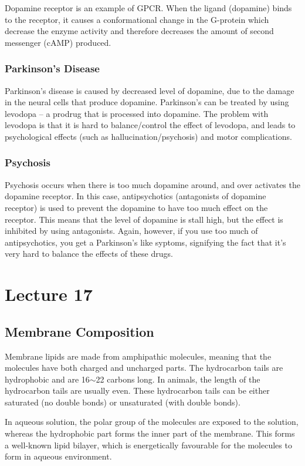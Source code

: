\documentclass[a4paper, 12pt]{report}
\newcommand{\mychapter}[2]{
    \setcounter{chapter}{#1}
    \setcounter{section}{0}
    \chapter*{#2}
    \addcontentsline{toc}{chapter}{#2}
}
\begin{document}
Dopamine receptor is an example of GPCR.
When the ligand (dopamine) binds to the receptor, it causes a conformational change in the G-protein which decrease the enzyme activity and therefore decreases the amount of second messenger (cAMP) produced.

\subsection{Parkinson's Disease}

Parkinson's disease is caused by decreased level of dopamine, due to the damage in the neural cells that produce dopamine.
Parkinson's can be treated by using levodopa -- a prodrug that is processed into dopamine.
The problem with levodopa is that it is hard to balance/control the effect of levodopa, and leads to psychological effects (such as hallucination/psychosis) and motor complications.

\subsection{Psychosis}

Psychosis occurs when there is too much dopamine around, and over activates the dopamine receptor.
In this case, antipsychotics (antagonists of dopamine receptor) is used to prevent the dopamine to have too much effect on the receptor.
This means that the level of dopamine is stall high, but the effect is inhibited by using antagonists.
Again, however, if you use too much of antipsychotics, you get a Parkinson's like syptoms, signifying the fact that it's very hard to balance the effects of these drugs.

\mychapter{17}{Lecture 17}

\section{Membrane Composition}

Membrane lipids are made from amphipathic molecules, meaning that the molecules have both charged and uncharged parts.
The hydrocarbon tails are hydrophobic and are 16$\sim$22 carbons long.
In animals, the length of the hydrocarbon tails are usually even.
These hydrocarbon tails can be either saturated (no double bonds) or unsaturated (with double bonds).

In aqueous solution, the polar group of the molecules are exposed to the solution, whereas the hydrophobic part forms the inner part of the membrane.
This forms a well-known lipid bilayer, which is energetically favourable for the molecules to form in aqueous environment.
\end{document}
